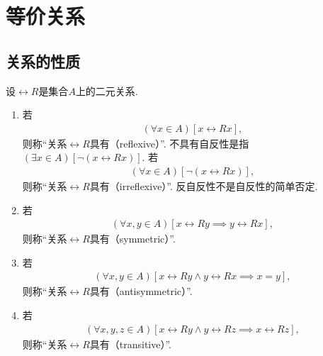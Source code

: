 \section{等价关系}
\subsection{关系的性质}
\begin{definition}
    设\(\rel{R}\)是集合\(A\)上的二元关系.
    \begin{enumerate}
        \item 若
        \begin{align*}
            (\forall x\in A)[x\rel{R}x],
        \end{align*}
        则称“关系\(\rel{R}\)具有（reflexive）”.
        不具有自反性是指\((\exists x\in A)[\neg(x\rel{R}x)]\).
        若
        \begin{align*}
            (\forall x\in A)[\neg(x\rel{R}x)],
        \end{align*}
        则称“关系\(\rel{R}\)具有（irreflexive）”.
        反自反性不是自反性的简单否定.

        \item 若
        \begin{align*}
            (\forall x,y\in A)[x\rel{R}y\implies y\rel{R}x],
        \end{align*}
        则称“关系\(\rel{R}\)具有（symmetric）”.

        \item 若
        \begin{align*}
            (\forall x,y\in A)[x\rel{R}y\land y\rel{R}x\implies x=y],
        \end{align*}
        则称“关系\(\rel{R}\)具有（antisymmetric）”.

        \item 若
        \begin{align*}
            (\forall x,y,z\in A)[x\rel{R}y\land y\rel{R}z\implies x\rel{R}z],
        \end{align*}
        则称“关系\(\rel{R}\)具有（transitive）”.
    \end{enumerate}
\end{definition}

